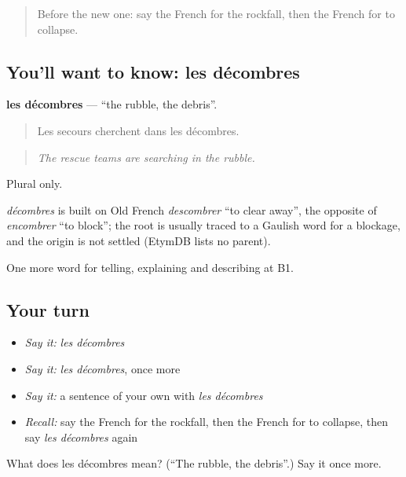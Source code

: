 \label{lesson:FR-C303-decombres}



\begin{quote}
Before the new one: say the French for the rockfall, then the French for to collapse.
\end{quote}

\subsection*{You'll want to know: les décombres}
\textbf{les décombres} — \textquotedblleft{}the rubble, the debris\textquotedblright{}.

\begin{quote}
Les secours cherchent dans les décombres.
\end{quote}

\begin{quote}
\emph{The rescue teams are searching in the rubble.}
\end{quote}

Plural only.

\begin{cousinweb}
\emph{décombres} is built on Old French \emph{descombrer} \textquotedblleft{}to clear away\textquotedblright{}, the opposite of \emph{encombrer} \textquotedblleft{}to block\textquotedblright{}; the root is usually traced to a Gaulish word for a blockage, and the origin is not settled (EtymDB lists no parent).
\end{cousinweb}

\begin{grammarlens}[title={What you've built}]
One more word for telling, explaining and describing at B1.
\end{grammarlens}

\subsection*{Your turn}
\begin{itemize}
\raggedright
  \item \emph{Say it:} \emph{les décombres}
  \item \emph{Say it:} \emph{les décombres}, once more
  \item \emph{Say it:} a sentence of your own with \emph{les décombres}
  \item \emph{Recall:} say the French for the rockfall, then the French for to collapse, then say \emph{les décombres} again
\end{itemize}

\begin{tcolorbox}[breakable,colback=teal!4,colframe=teal!35!black,title={Before you move on}]
What does les décombres mean? (\textquotedblleft{}The rubble, the debris\textquotedblright{}.) Say it once more.
\end{tcolorbox}
